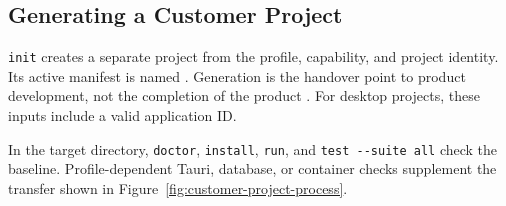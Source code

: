 \subsection{Generating a Customer Project}
\label{subsec:generierung-kundenprojekt}

\texttt{init} creates a separate project from the profile, capability, and
project identity. Its active manifest is named
. Generation is the handover point to product
development, not the completion of the product
\parencite{kleiveist2026tooling,kleiveist2026profiles}.
For desktop projects, these inputs include a valid application ID.

In the target directory, \texttt{doctor}, \texttt{install}, \texttt{run}, and
\texttt{test {-}{-}suite all} check the baseline. Profile-dependent Tauri,
database, or container checks supplement the transfer shown in
Figure~\ref{fig:customer-project-process}.


